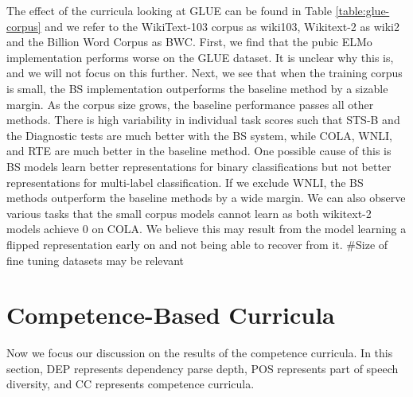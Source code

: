 The effect of the curricula looking at GLUE can be found in Table \ref{table:glue-corpus} and we refer to the WikiText-103 corpus as wiki103, Wikitext-2 as wiki2 and the Billion Word Corpus as BWC. First, we find that the pubic ELMo implementation performs worse on the GLUE dataset. It is unclear why this is, and we will not focus on this further. Next, we see that when the training corpus is small, the BS implementation outperforms the baseline method by a sizable margin. As the corpus size grows, the baseline performance passes all other methods. There is high variability in individual task scores such that STS-B and the Diagnostic tests are much better with the BS system, while COLA, WNLI, and RTE are much better in the baseline method. One possible cause of this is BS models learn better representations for binary classifications but not better representations for multi-label classification. If we exclude WNLI, the BS methods outperform the baseline methods by a wide margin. We can also observe various tasks that the small corpus models cannot learn as both wikitext-2 models achieve 0 on COLA. We believe this may result from the model learning a flipped representation early on and not being able to recover from it. #Size of fine tuning datasets may be relevant
\section{Competence-Based Curricula}
Now we focus our discussion on the results of the competence curricula. In this section, DEP represents dependency parse depth, POS represents part of speech diversity, and CC represents competence curricula.
